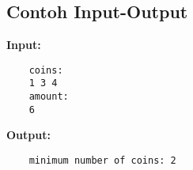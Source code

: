\subsection{Contoh Input-Output}
\textbf{Input:}
\begin{verbatim}
    coins:
    1 3 4
    amount:
    6
\end{verbatim}

\textbf{Output:}
\begin{verbatim}
    minimum number of coins: 2
\end{verbatim}






